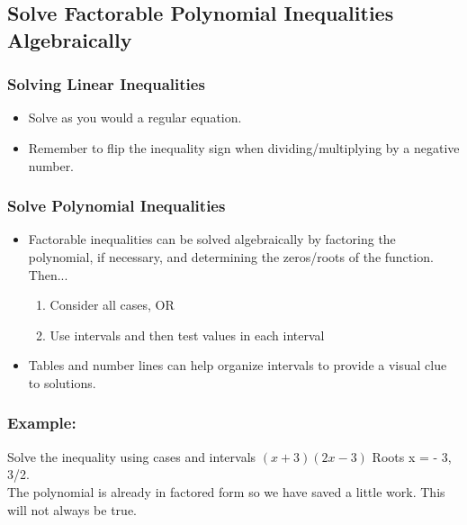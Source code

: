 \documentclass{article}
\begin{document}
\newpage 
\subsection{Solve Factorable Polynomial Inequalities Algebraically}
\subsubsection{Solving Linear Inequalities}
\begin{itemize}
    \item Solve as you would a regular equation.
    \item Remember to flip the inequality sign when dividing/multiplying by a negative number. 
\end{itemize}
\subsubsection{Solve Polynomial Inequalities}
\begin{itemize}
    \item Factorable inequalities can be solved algebraically by factoring the polynomial, if
necessary, and determining the zeros/roots of the function.
Then...
\begin{enumerate}
    \item Consider all cases, OR
    \item Use intervals and then test values in each interval
\end{enumerate}
    \item Tables and number lines can help organize intervals to provide a visual clue to solutions. 
\end{itemize}

\subsubsection*{Example:} 
Solve the inequality using cases and intervals $(x+3)(2x-3)$
Roots x = - 3, 3/2.\\ 
The polynomial is already in factored form so we have saved a little work. This will not always be true.
\end{document}
